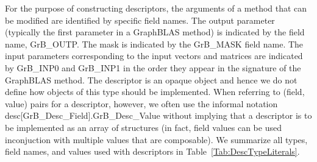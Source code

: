For the purpose of constructing descriptors, the arguments of a method
that can be modified are identified by specific field names. The output
parameter (typically the first parameter in a GraphBLAS method) is
indicated by the field name, {\sf GrB\_OUTP}.  The mask is indicated
by the {\sf GrB\_MASK} field name. The input parameters corresponding
to the input vectors and matrices are indicated by {\sf GrB\_INP0}
and {\sf GrB\_INP1} in the order they appear in the signature of the
GraphBLAS method.  The descriptor is an opaque object and hence we do not
define how objects of this type should be implemented.   When referring to
(field, value) pairs for a descriptor, however, we often use the informal
notation {\sf desc[GrB\_Desc\_Field].GrB\_Desc\_Value} without implying
that a descriptor is to be implemented as an array of structures (in fact,
field values can be used inconjuction with multiple values that are composable).
We summarize all types, field names, and values used with descriptors
in Table~\ref{Tab:DescTypeLiterals}.

